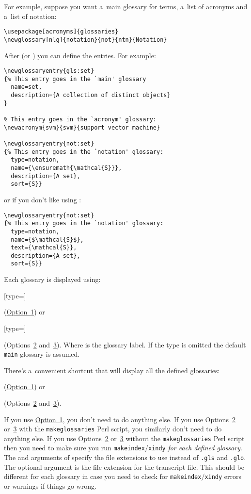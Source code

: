 \documentclass{nlctdoc}
\newcommand*{\opt}[1]{\hyperlink{option#1}{Option~#1}}
\newcommand*{\optsor}[2]{Options~\hyperlink{option#1}{#1}
or~\hyperlink{option#2}{#2}}
\newcommand*{\optsand}[2]{Options~\hyperlink{option#1}{#1}
and~\hyperlink{option#2}{#2}}
\begin{document}
For example, suppose you want a~main glossary for terms, a~list of
acronyms and a~list of notation:
\begin{verbatim}
\usepackage[acronyms]{glossaries}
\newglossary[nlg]{notation}{not}{ntn}{Notation}
\end{verbatim}
After  (or ) you can
define the entries. For example:
\begin{verbatim}
\newglossaryentry{gls:set}
{% This entry goes in the `main' glossary
  name=set,
  description={A collection of distinct objects}
}

% This entry goes in the `acronym' glossary:
\newacronym{svm}{svm}{support vector machine}

\newglossaryentry{not:set}
{% This entry goes in the `notation' glossary:
  type=notation,
  name={\ensuremath{\mathcal{S}}},
  description={A set},
  sort={S}}
\end{verbatim}
or if you don't like using :
\begin{verbatim}
\newglossaryentry{not:set}
{% This entry goes in the `notation' glossary:
  type=notation,
  name={$\mathcal{S}$},
  text={\mathcal{S}},
  description={A set},
  sort={S}}
\end{verbatim}

Each glossary is displayed using:
\begin{definition}
[type=]
\end{definition}
(\opt1) or
\begin{definition}
[type=]
\end{definition}
(\optsand23). Where  is the glossary label. If the
type is omitted the default \texttt{main} glossary is assumed.

There's a~convenient shortcut that will display all the defined
glossaries:
\begin{definition}
\end{definition}
(\opt1) or
\begin{definition}
\end{definition}
(\optsand23).

If you use \opt1, you don't need to do anything else. If you use
\optsor23 with the \texttt{makeglossaries} Perl script, you
similarly don't need to do anything else. If you use \optsor23 
without the \texttt{makeglossaries} Perl script then you need to
make sure you run \texttt{makeindex}\slash\texttt{xindy} \emph{for
each defined glossary}. The  and  arguments of
 specify the file extensions to use instead of
\texttt{.gls} and \texttt{.glo}. The optional argument  is
the file extension for the transcript file. This should be different
for each glossary in case you need to check for
\texttt{makeindex}\slash\texttt{xindy} errors or warnings if things
go wrong.
\end{document}
